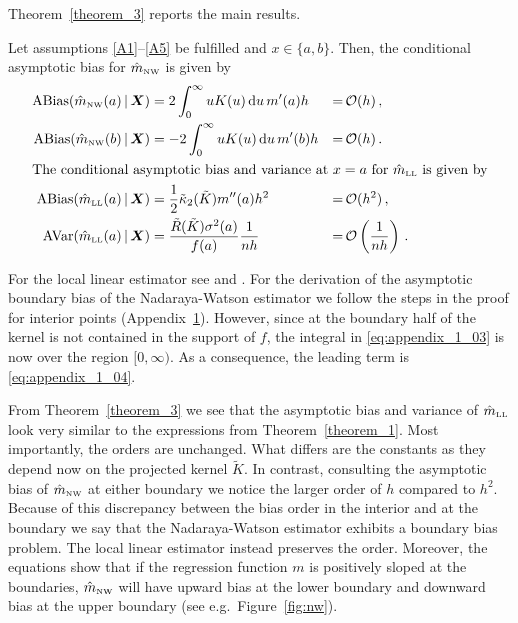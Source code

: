 Theorem~\ref{theorem_3} reports the main results.
\begin{theorem} \label{theorem_3}
	Let assumptions \ref{A1}--\ref{A5} be fulfilled and $x \in \{a, b\}$. Then, the conditional asymptotic bias for $\hat{m}_{\textup{\tiny NW}}$ is given by
	\begin{align}
		\operatorname{ABias} (\hat{m}_{\textup{\tiny NW}}(a) \,|\, \bm{X}) &= 2 \int_{0}^{\infty} u K(u) \mathop{}\!\textup{d} u \, m'(a) h &=& \operatorname{\mathcal{O}}(h) \,, \\
		\operatorname{ABias} (\hat{m}_{\textup{\tiny NW}}(b) \,|\, \bm{X}) &= -2 \int_{0}^{\infty} u K(u) \mathop{}\!\textup{d} u \, m'(b) h &=& \operatorname{\mathcal{O}}(h) \,. \\
		\intertext{The conditional asymptotic bias and variance at $x = a$ for $\hat{m}_{\textup{\tiny LL}}$ is given by}
		\operatorname{ABias} (\hat{m}_{\textup{\tiny LL}}(a) \,|\, \bm{X}) &= \frac{1}{2} \tilde{\kappa}_2(\tilde{K}) m''(a) h^2 &=& \operatorname{\mathcal{O}}(h^2) \,, \\
		\operatorname{AVar} (\hat{m}_{\textup{\tiny LL}}(a) \,|\, \bm{X}) &= \frac{\tilde{R}(\tilde{K}) \sigma^2(a)}{f(a)} \frac{1}{nh} &=& \operatorname{\mathcal{O}}\left( \frac{1}{nh} \right) \,.
	\end{align}
\end{theorem}
For the local linear estimator see \textcite[Section 19.10]{Hansen_2022} and \textcite[Theorem 3.3]{Fan_1996}.
For the derivation of the asymptotic boundary bias of the Nadaraya-Watson estimator we follow the steps in the proof for interior points (Appendix~\hyperref[appendix_1]{1}).
However, since at the boundary half of the kernel is not contained in the support of $f$, the integral in \eqref{eq:appendix_1_03} is now over the region $[0, \infty)$.
As a consequence, the leading term is \eqref{eq:appendix_1_04}.

From Theorem~\ref{theorem_3} we see that the asymptotic bias and variance of $\hat{m}_{\textup{\tiny LL}}$ look very similar to the expressions from Theorem~\ref{theorem_1}.
Most importantly, the orders are unchanged.
What differs are the constants as they depend now on the projected kernel $\tilde{K}$.
In contrast, consulting the asymptotic bias of $\hat{m}_{\textup{\tiny NW}}$ at either boundary we notice the larger order of $h$ compared to $h^2$.
Because of this discrepancy between the bias order in the interior and at the boundary we say that the Nadaraya-Watson estimator exhibits a boundary bias problem.
The local linear estimator instead preserves the order.
Moreover, the equations show that if the regression function $m$ is positively sloped at the boundaries,
$\hat{m}_{\textup{\tiny NW}}$ will have upward bias at the lower boundary and downward bias at the upper boundary (see e.g.\ Figure~\ref{fig:nw}). 

